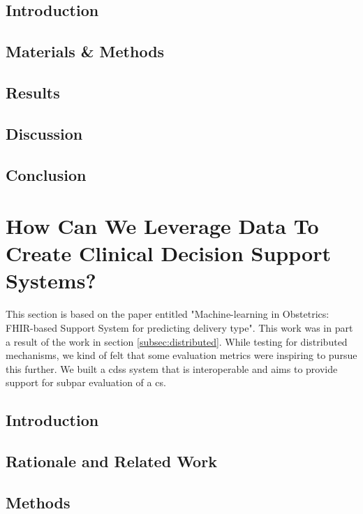     
\subsection{Introduction}
    
    \subsection{Materials \& Methods}
    
    \subsection{Results}
    
    \subsection{Discussion}
    
    \subsection{Conclusion}
    
    
    
    \section{How Can We Leverage Data To Create Clinical Decision Support Systems?}\label{subsec:obs}
    This section is based on the paper entitled "Machine-learning in Obstetrics: FHIR-based Support System for predicting delivery type". This work was in part a result of the work in section \ref{subsec:distributed}. While testing for distributed mechanisms, we kind of felt that some evaluation metrics were inspiring to pursue this further. We built a \ac{cdss} system that is interoperable and aims to provide support for subpar evaluation of a \ac{cs}.
    
    \subsection{Introduction}
    
    \subsection{Rationale and Related Work}
    
    \subsection{Methods}
